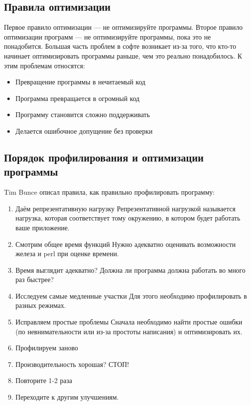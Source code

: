\subsection{Правила оптимизации}
Первое правило оптимизации --- не оптимизируйте программы. Второе правило оптимизации программ --- не оптимизируйте программы, пока это не понадобится. Большая часть проблем в софте возникает из-за того, что кто-то начинает оптимизировать программы раньше, чем это реально понадобилось. К этим проблемам относятся:
\begin{itemize}
  \item Превращение программы в нечитаемый код
  \item Программа превращается в огромный код
  \item Программу становится сложно поддерживать
  \item Делается ошибочное допущение без проверки
\end{itemize}

\subsection{Порядок профилирования и оптимизации программы}
Tim Bunce описал правила, как правильно профилировать программу:
\begin{enumerate}
    \item Даём репрезентативную нагрузку
      Репрезентативной нагрузкой называется нагрузка, которая соответствует тому окружению, в котором будет работать ваше приложение.
    \item Смотрим общее время функций
      Нужно адекватно оценивать возможности железа и perl при оценке времени.
    \item Время выглядит адекватно?
      Должна ли программа должна работать во много раз быстрее?
    \item Исследуем самые медленные участки
      Для этого необходимо профилировать в разных режимах.
    \item Исправляем простые проблемы
      Сначала необходимо найти простые ошибки (по невнимательности или из-за простоты написания) и оптимизировать их.
    \item Профилируем заново
    \item Производительность хорошая? СТОП!
    \item Повторите 1-2 раза
    \item Переходите к другим улучшениям.
\end{enumerate}

